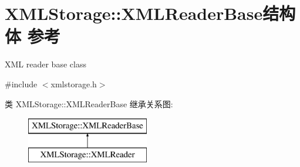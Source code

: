 \hypertarget{struct_x_m_l_storage_1_1_x_m_l_reader_base}{}\section{X\+M\+L\+Storage\+:\+:X\+M\+L\+Reader\+Base结构体 参考}
\label{struct_x_m_l_storage_1_1_x_m_l_reader_base}


X\+ML reader base class  




{\ttfamily \#include $<$xmlstorage.\+h$>$}

类 X\+M\+L\+Storage\+:\+:X\+M\+L\+Reader\+Base 继承关系图\+:\begin{figure}[H]
\begin{center}
\leavevmode
\includegraphics[height=2.000000cm]{struct_x_m_l_storage_1_1_x_m_l_reader_base}
\end{center}
\end{figure}
